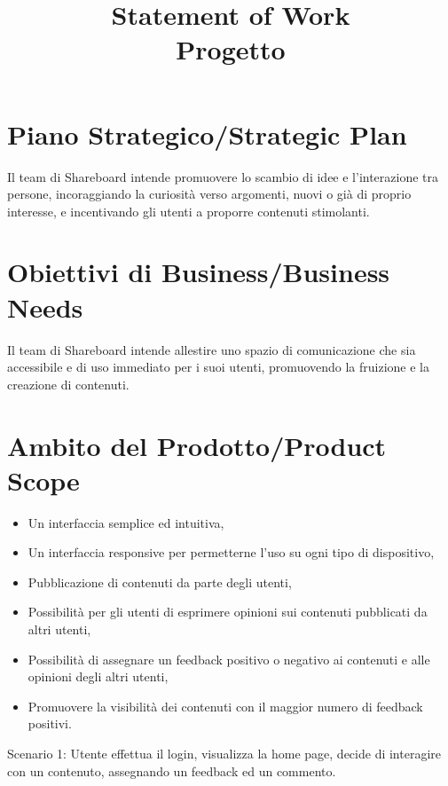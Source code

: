\documentclass[12pt]{article}
\title{Statement of Work\\Progetto}
\author{\presentatoda}
\begin{document}
\maketitle

\begin{versionhistory}
\end{versionhistory}
\clearpage

\section{Piano Strategico/Strategic Plan}
  Il team di Shareboard intende promuovere lo scambio di idee e l’interazione tra persone, incoraggiando la curiosità verso argomenti, nuovi o già di proprio interesse, e incentivando gli utenti a proporre contenuti stimolanti.
  
  \section{Obiettivi di Business/Business Needs}
  Il team di Shareboard intende allestire uno spazio di comunicazione che sia accessibile e di uso immediato per i suoi utenti, promuovendo la fruizione e la creazione di contenuti.
  
  \section{Ambito del Prodotto/Product Scope}
  
  \begin{itemize}
  
  \item Un interfaccia semplice ed intuitiva,
  \item Un interfaccia responsive per permetterne l’uso su ogni tipo di dispositivo,
  \item Pubblicazione di contenuti da parte degli utenti,
  \item Possibilità per gli utenti di esprimere opinioni sui contenuti pubblicati da altri utenti,
  \item Possibilità di assegnare un feedback positivo o negativo ai contenuti e alle opinioni degli altri utenti,
  \item Promuovere la visibilità dei contenuti con il maggior numero di feedback positivi.
  
  \end{itemize}
  
  Scenario 1:
  Utente effettua il login, visualizza la home page, decide di interagire con un contenuto, assegnando un feedback ed un commento.
  
\end{document}

